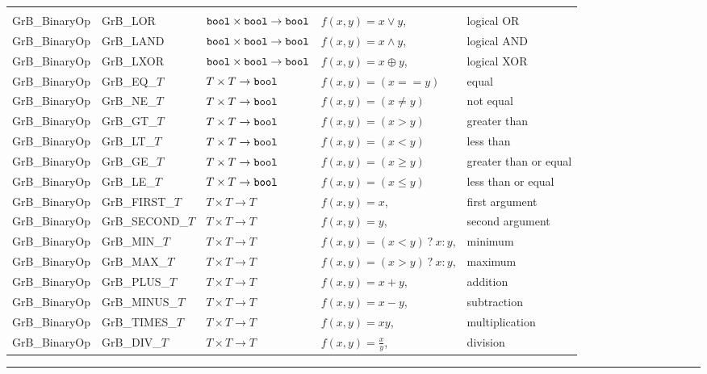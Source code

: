 \begin{table}
\begin{center}
\begin{tabular}{l|l|l|ll}
&&&\\
{\sf GrB\_BinaryOp}   & {\sf GrB\_LOR}        & ${\tt bool} \times {\tt bool} \rightarrow {\tt bool}$ & $f(x,y) = x \lor y$, & logical OR \\
{\sf GrB\_BinaryOp}   & {\sf GrB\_LAND}       & ${\tt bool} \times {\tt bool} \rightarrow {\tt bool}$ & $f(x,y) = x \land y$, & logical AND \\
{\sf GrB\_BinaryOp}   & {\sf GrB\_LXOR}       & ${\tt bool} \times {\tt bool} \rightarrow {\tt bool}$ & $f(x,y) = x \oplus y$, & logical XOR \\
{\sf GrB\_BinaryOp}   & {\sf GrB\_EQ\_$T$}    & $T \times T \rightarrow {\tt bool}$  & $f(x,y) = (x == y)$ & equal \\
{\sf GrB\_BinaryOp}   & {\sf GrB\_NE\_$T$}    & $T \times T \rightarrow {\tt bool}$  & $f(x,y) = (x \neq y)$ & not equal \\
{\sf GrB\_BinaryOp}   & {\sf GrB\_GT\_$T$}    & $T \times T \rightarrow {\tt bool}$  & $f(x,y) = (x > y)$ & greater than  \\
{\sf GrB\_BinaryOp}   & {\sf GrB\_LT\_$T$}    & $T \times T \rightarrow {\tt bool}$  & $f(x,y) = (x < y)$ & less than  \\
{\sf GrB\_BinaryOp}   & {\sf GrB\_GE\_$T$}    & $T \times T \rightarrow {\tt bool}$  & $f(x,y) = (x \geq y)$ & greater than or equal \\
{\sf GrB\_BinaryOp}   & {\sf GrB\_LE\_$T$}    & $T \times T \rightarrow {\tt bool}$  & $f(x,y) = (x \leq y)$ & less than or equal \\
{\sf GrB\_BinaryOp}   & {\sf GrB\_FIRST\_$T$} & $T \times T \rightarrow T$  & $f(x,y) = x$, & first argument \\
{\sf GrB\_BinaryOp}   & {\sf GrB\_SECOND\_$T$}& $T \times T \rightarrow T$  & $f(x,y) = y$, & second argument \\
{\sf GrB\_BinaryOp}   & {\sf GrB\_MIN\_$T$}   & $T \times T \rightarrow T$  & $f(x,y) = (x < y)~?~x : y$, & minimum \\
{\sf GrB\_BinaryOp}   & {\sf GrB\_MAX\_$T$}   & $T \times T \rightarrow T$  & $f(x,y) = (x > y)~?~x : y$, & maximum \\
{\sf GrB\_BinaryOp}   & {\sf GrB\_PLUS\_$T$}  & $T \times T \rightarrow T$  & $f(x,y) = x + y$, & addition \\
{\sf GrB\_BinaryOp}   & {\sf GrB\_MINUS\_$T$} & $T \times T \rightarrow T$  & $f(x,y) = x - y$, & subtraction \\
{\sf GrB\_BinaryOp}   & {\sf GrB\_TIMES\_$T$} & $T \times T \rightarrow T$  & $f(x,y) = xy$, & multiplication \\
{\sf GrB\_BinaryOp}   & {\sf GrB\_DIV\_$T$}   & $T \times T \rightarrow T$  & $f(x,y) = \frac{x}{y}$, & division \\
\end{tabular}
\end{center}
\hrule
\end{table}


